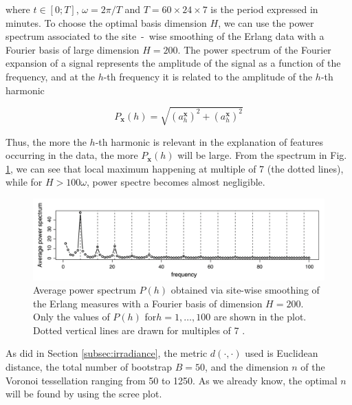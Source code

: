 where $t \in \left[ 0; T\right]$, $\omega = 2\pi/T$ and $T=60 \times 24 \times 7$ is the period expressed in minutes. To choose the optimal basis dimension $H$, we can use the power spectrum associated to the site~-~wise smoothing of the Erlang data with a Fourier basis of large dimension $H = 200$. The power spectrum of the Fourier expansion of a signal represents the amplitude of the signal as a function of the frequency, and at the $h$-th frequency it is related to the amplitude of the $h$-th harmonic

\begin{equation}
    \label{eq:spectrum}
    P_{\mathbf{x}}(h)=\sqrt{(a^{\mathbf{x}}_h)^2 + (a^{\mathbf{x}}_h)^2}
\end{equation}

Thus, the more the $h$-th harmonic is relevant in the explanation of features occurring in the data, the more $P_{\mathbf{x}}(h)$ will be large. From the spectrum in Fig. \ref{fig:fantasmino}, we can see that local maximum happening at multiple of 7 (the dotted lines), while for $H >100\omega$, power spectre becomes almost negligible.

\begin{figure}[H]
    \centering
    \includegraphics[scale=0.6]{Images/fantasmino.png}
    \caption[Spectrum of Erlang data.]{Average power spectrum $P(h)$ obtained via site-wise smoothing of the Erlang measures with a Fourier basis of dimension $H = 200$. Only the values of $P(h)$ for$ h = 1, \dots, 100$ are shown in the plot. Dotted vertical lines are drawn for multiples of 7 \cite{secchi_analysis_2015}.}
    \label{fig:fantasmino}
\end{figure}

As did in Section \ref{subsec:irradiance}, the metric $d(\cdot, \cdot)$ used is Euclidean distance, the total number of bootstrap $B=50$, and the dimension $n$ of the Voronoi tessellation ranging from 50 to 1250. As we already know, the optimal $n$ will be found by using the scree plot.


